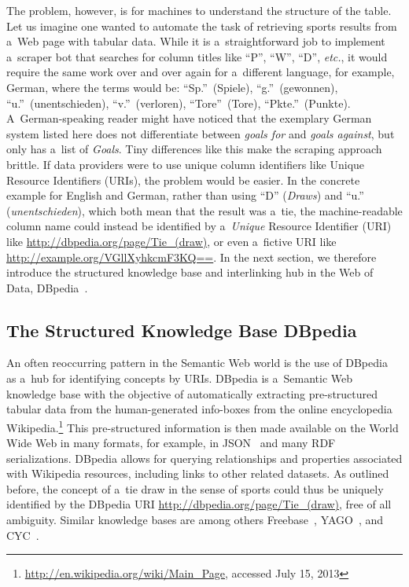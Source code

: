 The problem, however, is for machines to understand
the structure of the table.
Let us imagine one wanted to automate the task
of retrieving sports results from a~Web page with tabular data.
While it is a~straightforward job to implement
a~scraper bot that searches for column titles
like ``P'', ``W'', ``D'', \emph{etc.},
it would require the same work over and over again
for a~different language,
for example, German, where the terms would be:
``Sp.''~(Spiele), ``g.''~(gewonnen), ``u.''~(unentschieden),
``v.''~(verloren), ``Tore''~(Tore), ``Pkte.''~(Punkte).
A~German-speaking reader might have noticed
that the exemplary German system listed here
does not differentiate between \emph{goals for}
and \emph{goals against}, but only has a~list of \emph{Goals}.
Tiny differences like this make the scraping approach brittle.
If data providers were to use unique column identifiers like
Unique Resource Identifiers (URIs),
the problem would be easier.
In the concrete example for English and German,
rather than using ``D'' (\emph{Draws})
and ``u.'' (\emph{unentschieden}),
which both mean that the result was a~tie,
the machine-readable column name could instead be identified by
a~\emph{Unique} Resource Identifier (URI) like
\url{http://dbpedia.org/page/Tie_(draw)},
or even a~fictive URI like \url{http://example.org/VGllXyhkcmF3KQ==}.
In the next section, we therefore introduce
the structured knowledge base and interlinking hub
in the Web of Data, DBpedia~\cite{auer2007dbpedia}.

\subsection{The Structured Knowledge Base DBpedia}

An often reoccurring pattern
in the Semantic Web world
is the use of DBpedia~\cite{auer2007dbpedia}
as a~hub for identifying concepts by URIs.
DBpedia is a~Semantic Web knowledge base
with the objective of automatically extracting
pre-structured tabular data from the human-generated info-boxes
from the online encyclopedia
Wikipedia.\footnote{\url{http://en.wikipedia.org/wiki/Main_Page},
accessed July 15, 2013}
This pre-structured information is then made available
on the World Wide Web in many formats,
for example, in JSON~\cite{crockford2006json}
and many RDF~\cite{klyne2004rdf} serializations.
DBpedia allows for querying relationships
and properties associated with Wikipedia resources,
including links to other related datasets.
As outlined before, the concept of a~tie draw
in the sense of sports could thus be uniquely identified
by the DBpedia URI \url{http://dbpedia.org/page/Tie_(draw)},
free of all ambiguity.
Similar knowledge bases are among others
Freebase~\cite{bollacker2008freebase,markoff2007freebase},
YAGO~\cite{suchanek2007yago}, and CYC~\cite{lenat1995cyc}.


